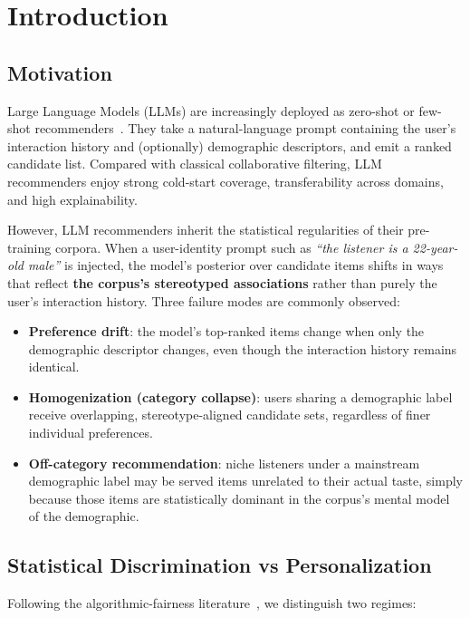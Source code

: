\section{Introduction}
\label{sec:intro}

\subsection{Motivation}

Large Language Models (LLMs) are increasingly deployed as zero-shot or few-shot recommenders~\cite{liu2023chatgpt,hou2024llmranker,bao2023tallrec}. They take a natural-language prompt containing the user's interaction history and (optionally) demographic descriptors, and emit a ranked candidate list. Compared with classical collaborative filtering, LLM recommenders enjoy strong cold-start coverage, transferability across domains, and high explainability.

However, LLM recommenders inherit the statistical regularities of their pre-training corpora. When a user-identity prompt such as \emph{``the listener is a 22-year-old male''} is injected, the model's posterior over candidate items shifts in ways that reflect \textbf{the corpus's stereotyped associations} rather than purely the user's interaction history. Three failure modes are commonly observed:

\begin{itemize}
\item \textbf{Preference drift}: the model's top-ranked items change when only the demographic descriptor changes, even though the interaction history remains identical.
\item \textbf{Homogenization (category collapse)}: users sharing a demographic label receive overlapping, stereotype-aligned candidate sets, regardless of finer individual preferences.
\item \textbf{Off-category recommendation}: niche listeners under a mainstream demographic label may be served items unrelated to their actual taste, simply because those items are statistically dominant in the corpus's mental model of the demographic.
\end{itemize}

\subsection{Statistical Discrimination vs Personalization}

Following the algorithmic-fairness literature~\cite{dwork2012fairness,barocas2017fairness}, we distinguish two regimes:

